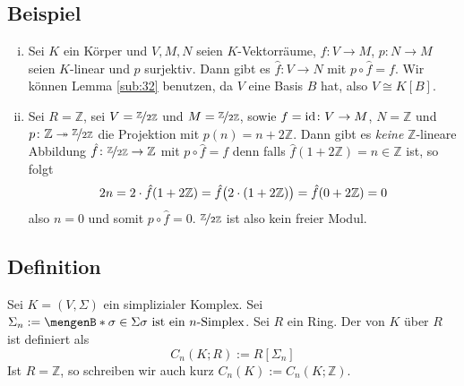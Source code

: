 \subsection[Beispiel für freie und nicht-freie Moduln]{Beispiel} %
\label{sub:33}
\begin{enumerate}[(i)]
	\item Sei $K$ ein Körper und $V,M,N$ seien $K$-Vektorräume, $f\colon V \to M$, $p\colon N \to M$ seien $K$-linear und $p$ surjektiv. Dann gibt es $\hat{f}\colon V\to N$ 
	mit $p \circ \hat{f} = f$. Wir können Lemma \ref{sub:32} benutzen, da $V$ eine Basis $B$ hat, also $V \cong K[B]$.
	\item Sei $R=\mathds{Z}$, sei $V= \nicefrac{\mathds{Z}}{2 \mathds{Z}}$ und $M = \nicefrac{\mathds{Z}}{2 \mathds{Z}}$, sowie $f= \id \colon V \to M$, $N= \mathds{Z}$ und 
	$p \colon \mathds{Z} \twoheadrightarrow \nicefrac{\mathds{Z}}{2 \mathds{Z}}$ die Projektion mit $p(n)= n + 2 \mathds{Z}$. Dann gibt es \emph{keine} $\mathds{Z}$-lineare 
	Abbildung $\hat{f} \colon \nicefrac{\mathds{Z}}{2 \mathds{Z}} \to \mathds{Z}$ mit $p \circ \hat{f} = f$ denn falls $\hat{f} (1+ 2 \mathds{Z}) = n \in \mathds{Z}$ ist, so 
	folgt 
	\[
		2 n = 2 \cdot \hat{f}(1+ 2 \mathds{Z}) = \hat{f} \enbrace[\big]{2 \cdot (1+ 2 \mathds{Z})} = \hat{f} (0+ 2 \mathds{Z}) =0
	\]
	also $n=0$ und somit $p \circ \hat{f}=0$. $\nicefrac{\mathds{Z}}{2 \mathds{Z}}$ ist also kein freier Modul.
\end{enumerate}

\subsection[Definition: $n$-ter Kettenmodul]{Definition} %
\label{sub:34}
Sei $K=(V, \Sigma)$ ein simplizialer Komplex. Sei $\Sigma_n := \set[\sigma \in \Sigma]{\sigma \text{ ist ein $n$-Simplex}}$. Sei $R$ ein Ring. Der 
 von $K$ über $R$ ist definiert als 
\[
	C_n(K;R) := R[\Sigma_n]
\]
Ist $R=\mathds{Z}$, so schreiben wir auch kurz $C_n(K) := C_n(K;\mathds{Z})$.

